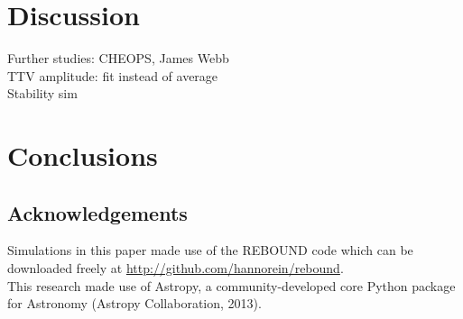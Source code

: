 \documentclass[12pt]{report}
\begin{document}

\chapter{Discussion}
	
	Further studies: CHEOPS, James Webb\\
	TTV amplitude: fit instead of average\\
	Stability sim
\chapter{Conclusions}


\section*{Acknowledgements}

Simulations in this paper made use of the REBOUND code which can be downloaded freely at \url{http://github.com/hannorein/rebound}.\vspace{0.5cm}\\
This research made use of Astropy, a community-developed core Python package for Astronomy (Astropy Collaboration, 2013).
\end{document}
